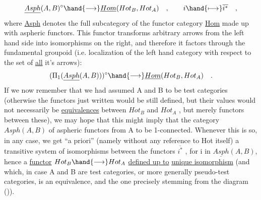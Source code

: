 
\[ \underline{Asph}(A,B)^{\circ}\hand{\longrightarrow}\underline{Hom}(Hot_{B},Hot_{A}) \quad , \qquad i \hand{\longmapsto} \overline{i^{*}} \quad , \]
where \uline{Asph} denotes the full subcategory of the functor category \uline{Hom}
made up with aspheric functors. This functor transforms arbitrary
arrows from the left hand side into isomorphisms on the right, and
therefore it factors through the fundamental groupoid (i.e. localization
of the left hand category with respect to the set of \uline{all} it's arrows):
\[ (\Pi_{1}(\underline{Asph}(A,B)))^{\circ} \hand{\longrightarrow} \underline{Hom}(Hot_{B},Hot_{A}) \quad . \]
If we now remember that we had assumed A and B to be test categories
(otherwise the functors just written would be still defined, but their
values would not necessarily be \uline{equivalences} between $Hot_{B}$ and $Hot_{A}$ ,
but merely functors between these), we may hope that this might imply
that the category $\underline{Asph}(A,B)$ of aspheric functors from A  to be 
1-connected. Whenever this is so, in any case, we get ``a priori''
(namely without any reference to Hot itself) a transitive system of
isomorphisms between the functors $\overline{i^{*}}$ , for i in $\underline{Asph}(A,B)$, 
 hence a  \uline{functor} $Hot_{B}\hand{\longrightarrow}Hot_{A}$\hand{\unsure{)|,}} \uline{defined up to}\hand{\unsure{,}} \uline{unique isomorphism}
(and which, in case A and B are test categories, or more generally
pseudo-test categories\xout{*}, is an equivalence, and the one precisely
 stemming from the diagram ()).

